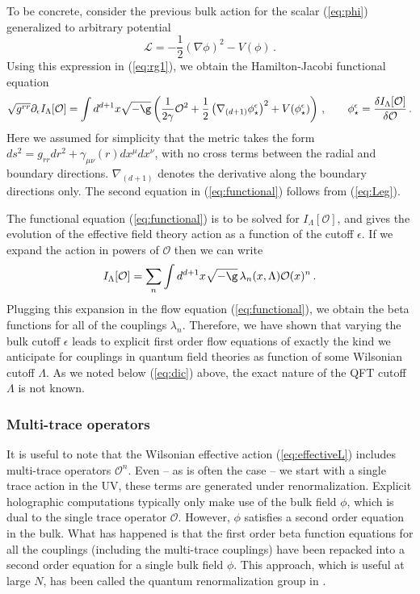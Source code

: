 \documentclass[10pt, oneside]{book}
\let\pa=\partial
\def\be{\begin{equation}}
\def\ee{\end{equation}}
\def\ep{{\epsilon}}
\def\Lag{{\mathcal{L}}}
\def\ocal{{\mathcal{O}}}
\begin{document}
\begin{doublespace}
To be concrete, consider the previous bulk action for the scalar (\ref{eq:phi}) generalized to arbitrary potential
\be
\Lag = - \frac{1}{2} \left(\nabla \phi \right)^2 - V(\phi) \,.
\ee
Using this expression in (\ref{eq:rg1}), we obtain the Hamilton-Jacobi functional equation 
\be\label{eq:functional}
\sqrt{g^{rr}}\pa_\ep I_\Lambda[\ocal] = \int d^{d+1}x \sqrt{-\g}\left(\frac{1}{2 \gamma} \ocal^2 + \frac{1}{2} \left(\nabla_{(d+1)} \phi_\star^\epsilon \right)^2 + V(\phi_\star^\epsilon) \right) \,, \qquad \phi_\star^\epsilon = \frac{\delta I_\Lambda[\ocal]}{\delta \ocal}\,.
\ee
Here we assumed for simplicity that the metric takes the form $ds^2 = g_{rr} dr^2 + \gamma_{\mu\nu}(r) dx^\mu dx^\nu$, with no cross terms between the radial and boundary directions. $\nabla_{(d+1)}$ denotes the derivative along the boundary directions only. The second equation in (\ref{eq:functional}) follows from (\ref{eq:Leg}).

The functional equation (\ref{eq:functional}) is to be solved for $I_\Lambda[\ocal]$, and gives the evolution of the effective field theory action as a function of the cutoff $\epsilon$. If we expand the action in powers of $\ocal$ then we can write
\be\label{eq:effectiveL}
I_\Lambda[\ocal] = \sum_n \int d^{d+1}x \sqrt{-\g} \,\lambda_n(x,\Lambda) \ocal(x)^n \,.
\ee
Plugging this expansion in the flow equation (\ref{eq:functional}), we obtain the beta functions for all of the couplings $\lambda_n$. Therefore, we have shown that varying the bulk cutoff $\epsilon$ leads to explicit first order flow equations of exactly the kind we anticipate for couplings in quantum field theories as function of some Wilsonian cutoff $\Lambda$. As we noted below (\ref{eq:dic}) above, the exact nature of the QFT cutoff $\Lambda$ is not known.

\subsubsection{Multi-trace operators}
\label{sec:multitrace}

It is useful to note that the Wilsonian effective action (\ref{eq:effectiveL}) includes multi-trace operators $\ocal^n$. Even -- as is often the case -- we start with a single trace action in the UV, these terms are generated under renormalization. Explicit holographic computations typically only make use of the bulk field $\phi$, which is dual to the single trace operator $\ocal$. However, $\phi$ satisfies a second order equation in the bulk. What has happened is that the first order beta function equations for all the couplings (including the multi-trace couplings) have been repacked into a second order equation for a single bulk field $\phi$. This approach, which is useful at large $N$, has been called the quantum renormalization group in \cite{Lee:2013dln}.


\end{doublespace}
\end{document}

